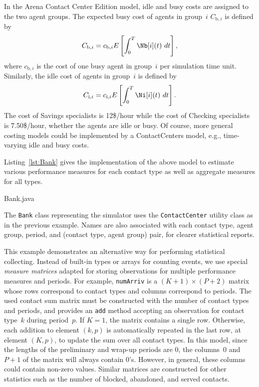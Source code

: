 In the Arena Contact Center Edition model, idle and busy costs are
assigned to the two
agent groups.  The expected busy cost of agents in group~$i$
$C_{\mathrm{b},i}$ is defined by
\[C_{\mathrm{b},i}=c_{\mathrm{b},i}E\left[\int_0^T \Nb[i](t)\ dt\right],\]
where $c_{\mathrm{b},i}$ is the cost of one busy agent in group~$i$
per simulation time unit.
Similarly, the idle cost of agents in group~$i$
is defined by
\[C_{\mathrm{i},i}=c_{\mathrm{i}, i}E\left[\int_0^T \Ni[i](t)\
  dt\right].\]
The cost of Savings specialists is 12\$/hour while the cost of
Checking specialists is 7.50\$/hour, whether the agents are idle or
busy.
Of course, more general costing models could be implemented by a
ContactCenters model, e.g., time-varying idle and busy costs.

Listing~\ref{lst:Bank} gives the implementation of the above model to
estimate various performance measures for each contact type as well as
aggregate measures for all types.


{Bank.java}

The \texttt{Bank} class representing the simulator uses the
\texttt{Contact\-Center} utility class as in the previous example.
Names are also associated with each contact type, agent group,
period, and (contact type, agent group) pair,
for clearer statistical reports.

This example demonstrates an alternative way for performing
statistical collecting.
Instead of built-in types or arrays for counting events, we
use special \emph{measure matrices} adapted for storing observations
for multiple
performance measures and periods.  For example, \texttt{num\-Arriv} is
a $(K+1)\times (P+2)$ matrix whose rows correspond to contact types and
columns correspond to periods.  The used contact sum matrix must be
constructed with the number of contact types and periods, and provides
an \texttt{add} method accepting an observation for contact type~$k$
during period~$p$.  If $K=1$, the matrix contains a single row.
Otherwise, each addition to element $(k, p)$ is automatically repeated
in the last row, at element $(K, p)$, to update the sum over all
contact types.
In this model, since the lengths of the preliminary and wrap-up
periods are 0, the columns~0 and~$P+1$ of the matrix will always
contain 0's.  However, in general, these columns could contain
non-zero values.  Similar matrices are constructed for other
statistics such as the number of blocked, abandoned, and served
contacts.

